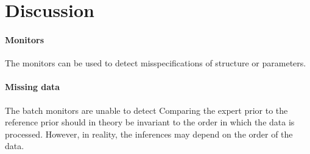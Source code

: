\documentclass[12pt]{article}
\begin{document}


\section{Discussion}
 
\paragraph{Monitors}
The monitors can be used to detect misspecifications of structure or parameters. 

\paragraph{Missing data} The batch monitors are unable to detect 
Comparing the expert prior to the reference prior should in theory be invariant to the order in which the data is processed. However, in reality, the inferences may depend on the order of the data. 
\end{document}
